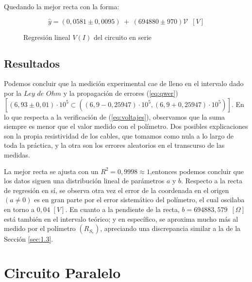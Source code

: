 \documentclass[11pt]{report}
\begin{document}
\begin{refsection}
Quedando la mejor recta con la forma:

\begin{equation}
    \hat{y}= (0,0581 \pm 0,0095) \hspace{3pt} + \hspace{3pt}(694880 \pm 970) \mathscr{V}\hspace{6pt} [V]
\end{equation}

\begin{figure}[H]
    \begin{center}
        
    \end{center}
    \caption{Regresión lineal $V(I)$ del circuito en serie}
\end{figure}


\subsection{Resultados}
\label{sec:1.4}

Podemos concluir que la medición experimental cae de lleno en el intervalo  dado por la $Ley$ $de$ $Ohm$ 
y la propagación de errores (\ref{eq:qwer}) $[(6,93 \pm 0,01) \cdot 10^5 \subset ((6,9 - 0,25947)\cdot 10^5,(6,9 + 0,25947)\cdot 10^5)]$.
En lo que respecta a la verificación de (\ref{eq:voltajes}), observamos que la suma siempre es menor que el valor medido con el polímetro.
Dos posibles explicaciones son la propia resistividad de los cables, que tomamos como nula a lo largo de toda la práctica, y la otra son los
errores aleatorios en el transcurso de las medidas. 

\medskip

La mejor recta se ajusta con un $R^2 = 0,9998 \approx 1$,entonces podemos concluir que los datos siguen una distribución lineal de parámetros
$a$ y $b$.
Respecto a la recta de regresión en sí, se observa otra vez el error de la coordenada en el origen $(a\neq 0)$ es en gran parte por el error
sistemático del polímetro, el cual oscilaba en torno a $0,04 \hspace{4pt}[V]$.
En cuanto a la pendiente de la recta, $b=694883,579\hspace{6pt}[\Omega]$
está también en el intervalo teórico; y en específico, se aproxima mucho más al medido por el polímetro $(R_{S_e})$, apreciando
una discrepancia similar a la de la Sección \ref{sec:1.3}.

\section{\textbf{Circuito Paralelo}}

\end{refsection}
\end{document}
